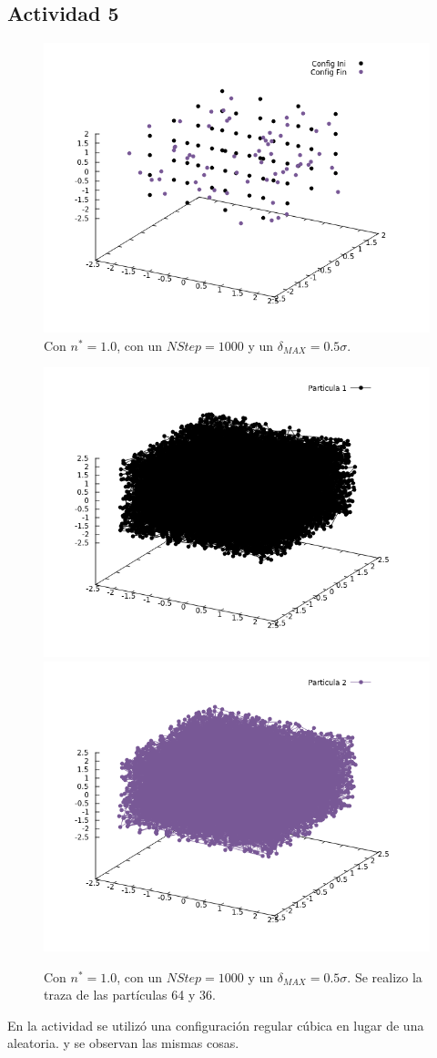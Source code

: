 \documentclass[12pt,letterpaper]{article}
\begin{document}
\subsection*{Actividad 5}
	\begin{figure}[H]
		\centering
		\includegraphics[width=0.5\linewidth]{ConfigS.png}
		\caption{ Con $n^*=1.0$, con un $NStep=1000$ y un $\delta_{MAX}=0.5\sigma$.}
	\end{figure}
	\begin{figure}[H]
		\centering
		\includegraphics[width=0.49\linewidth]{Parti1.png}
		\includegraphics[width=0.49\linewidth]{Parti2.png}
		\caption{Con $n^*=1.0$, con un $NStep=1000$ y un $\delta_{MAX}=0.5\sigma$. Se realizo la traza de las partículas 64 y 36.}
	\end{figure}
	
	En la actividad se utilizó una configuración regular cúbica  en lugar de una aleatoria. y se observan las mismas cosas.
	
\end{document}
